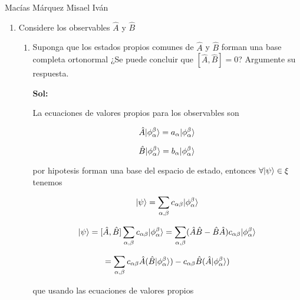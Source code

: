 \documentclass[12pt,a4paper]{article}
\DeclarePairedDelimiter\ket{\lvert}{\rangle}
\begin{document}
Macías Márquez Misael Iván

\begin{enumerate}









\item Considere los observables $\hat{A}$ y $\hat{B}$

\begin{enumerate}
    \item Suponga que los estados propios comunes de $\hat{A}$ y $\hat{B}$ forman una base completa ortonormal ¿Se puede concluir que $[\hat{A}, \hat{B}] =0$? Argumente su respuesta.
    
    \textbf{Sol:}
    
    La ecuaciones de valores propios para los observables son
    
    \begin{equation*}
        \hat{A} \ket{\phi_{\alpha}^{\beta}} = a_{\alpha} \ket{\phi_{\alpha}^{\beta}}
    \end{equation*}
    
    \begin{equation*}
        \hat{B} \ket{\phi_{\alpha}^{\beta}} = b_{\alpha} \ket{\phi_{\alpha}^{\beta}} 
    \end{equation*}
    
    por hipotesis forman una base  del espacio de estado, entonces $\forall \ket{\psi} \in \xi$ tenemos
    
    \begin{equation*}
        \ket{\psi} = \sum_{\alpha, \beta} c_{\alpha \beta} \ket{\phi_{\alpha}^{\beta}}
    \end{equation*}
    
    \begin{equation*}
        [\hat{A},\hat{B}] \ket{\psi} = [\hat{A}, \hat{B}] \sum_{\alpha, \beta} c_{\alpha \beta} \ket{\phi_{\alpha}^{\beta}} = \sum_{\alpha, \beta}(\hat{A}\hat{B}- \hat{B}\hat{A}) c_{\alpha \beta} \ket{\phi_{\alpha}^{\beta}}
    \end{equation*}
    
    \begin{equation*}
        = \sum_{\alpha, \beta}c_{\alpha \beta} \hat{A}(\hat{B}  \ket{\phi_{\alpha}^{\beta}}) -c_{\alpha \beta}   \hat{B}(\hat{A}  \ket{\phi_{\alpha}^{\beta}})
    \end{equation*}
    
    que usando las ecuaciones de valores propios
    

\end{enumerate}
\end{enumerate}
\end{document}
